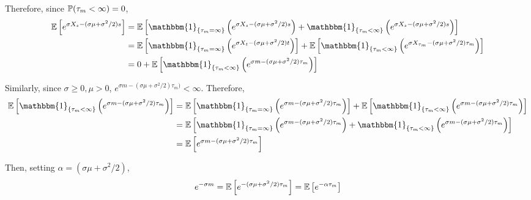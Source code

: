 \begin{solution}[Solution]
Therefore, since \( \mathbb{P}(\tau_m <\infty) = 0 \),
\begin{align*}
    \EE \left[ e^{\sigma X_s - (\sigma \mu+\sigma^2/2) s} \right]
    &= \EE \left[ \mathbbm{1}_{\{\tau_m = \infty\}} \left( e^{\sigma X_s - (\sigma \mu+\sigma^2/2) s} \right)+ \mathbbm{1}_{\{\tau_m < \infty\}} \left( e^{\sigma X_s - (\sigma \mu+\sigma^2/2) s} \right) \right]
    \\&= \EE \left[ \mathbbm{1}_{\{\tau_m = \infty \}} \left( e^{\sigma X_t - (\sigma \mu+\sigma^2/2) t} \right) \right] + \EE \left[ \mathbbm{1}_{\{\tau_m<\infty\}} \left( e^{\sigma X_{\tau_m} - (\sigma \mu+\sigma^2/2) \tau_m} \right) \right]
    \\&= 0 + \EE \left[ \mathbbm{1}_{\{\tau_m<\infty\}} \left( e^{\sigma m - (\sigma \mu+\sigma^2/2) \tau_m} \right) \right]
\end{align*}

Similarly, since \( \sigma\geq 0, \mu>0 \), \( e^{\sigma m - (\sigma\mu+\sigma^2/2)\tau_m) } < \infty  \). Therefore,
\begin{align*}
    \EE \left[ \mathbbm{1}_{\{\tau_m<\infty\}} \left( e^{\sigma m - (\sigma \mu+\sigma^2/2) \tau_m} \right) \right]
    &= \EE \left[ \mathbbm{1}_{\{\tau_m=\infty\}} \left( e^{\sigma m - (\sigma \mu+\sigma^2/2) \tau_m} \right) \right]
    +\EE \left[ \mathbbm{1}_{\{\tau_m<\infty\}} \left( e^{\sigma m - (\sigma \mu+\sigma^2/2) \tau_m} \right) \right]
    \\&= \EE \left[ \mathbbm{1}_{\{\tau_m=\infty\}} \left( e^{\sigma m - (\sigma \mu+\sigma^2/2) \tau_m} \right) + \mathbbm{1}_{\{\tau_m<\infty\}} \left( e^{\sigma m - (\sigma \mu+\sigma^2/2) \tau_m} \right) \right]
    \\&= \EE \left[ e^{\sigma m - (\sigma \mu+\sigma^2/2) \tau_m} \right]
\end{align*}

\iffalse
In the limit \( t\to\infty \), since \( \tau_m < \infty\) a.s. , \( s = \min\{t,\tau_m\} \to \tau_m < \infty \) and \( X_s \to X_{\tau_m} = m \). Thus,
\begin{align*}
    1 = \lim_{t\to\infty} \EE \left[ e^{\sigma X_s - (\sigma \mu+\sigma^2/2) s} \right]
      = \EE \left[ \lim_{t\to\infty} e^{\sigma X_s - (\sigma \mu+\sigma^2/2) s} \right]
      = \EE \left[ e^{\sigma m - (\sigma \mu+\sigma^2/2) \tau_m} \right]
\end{align*}
\fi

Then, setting \( \alpha = (\sigma\mu+\sigma^2/2) \),
\begin{align*}
    e^{-\sigma m} = \mathbb{E} \left[ e^{-(\sigma \mu+\sigma^2/2)\tau_m} \right] = \mathbb{E} \left[ e^{-\alpha \tau_m} \right]
\end{align*}


\end{solution}
